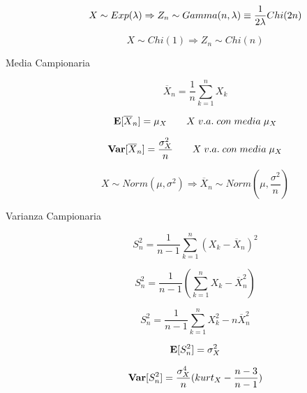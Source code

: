 \begin{description}
	\begin{equation}
	X \sim Exp(\lambda) \Rightarrow Z_{n} \sim Gamma(n, \lambda) \equiv \frac{1}{2\lambda}Chi(2n)\\
	\end{equation}
	
	\begin{equation}
	X \sim Chi(1) \Rightarrow Z_{n} \sim Chi(n)
	\end{equation}
	
	\item[Media Campionaria]
	\begin{equation}
	\overline{X}_{n} = \frac{1}{n}\sum_{k=1}^{n} X_{k}
	\end{equation}
	
	\begin{equation}
	\mathbf{E}[\overline{X}_{n}] = \mu_{X} \qquad X \; v.a. \; con \; media \; \mu_{X}
	\end{equation}
	
	\begin{equation}
	\mathbf{Var}[\overline{X}_{n}] = \frac{\sigma_{X}^{2}}{n} \qquad X \; v.a. \; con \; media \; \mu_{X}
	\end{equation}
	
	\begin{equation}
	X \sim Norm(\mu,\sigma^{2}) \Rightarrow \overline{X}_{n} \sim Norm(\mu,\frac{\sigma^{2}}{n})
	\end{equation}
	
	\item[Varianza Campionaria]
	\begin{equation}
	S_{n}^{2} = \frac{1}{n-1}\sum_{k=1}^{n} (X_{k}-\overline{X}_{n})^{2}
	\end{equation}
	
	\begin{equation}
	S_{n}^{2} = \frac{1}{n-1}(\sum_{k=1}^{n} X_{k}-\overline{X}_{n}^{2})
	\end{equation}
	
	\begin{equation}
	S_{n}^{2} = \frac{1}{n-1}\sum_{k=1}^{n}X_{k}^{2}-n\overline{X}_{n}^{2}
	\end{equation}
	
	\begin{equation}
	\mathbf{E}[S_{n}^{2}] = \sigma_{X}^{2}
	\end{equation}
	
	\begin{equation}
	\mathbf{Var}[S_{n}^{2}] = \frac{\sigma_{X}^{4}}{n}(kurt_{X}-\frac{n-3}{n-1})
	\end{equation}
	

\end{description}
